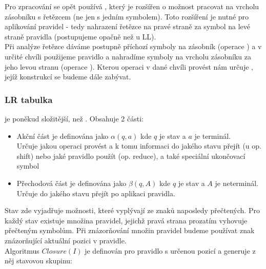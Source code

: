 Pro zpracování se opět používá , který je
rozšířen o možnost pracovat na vrcholu zásobníku s řetězcem (ne jen s jedním symbolem).
Toto rozšíření je nutné pro aplikování pravidel - tedy nahrazení řetězce na pravé straně za
symbol na levé straně pravidla (postupujeme opačně než u LL).\\

Při analýze řetězce dáváme postupně příchozí symboly na zásobník (operace )
a v určité chvíli použijeme pravidlo a nahradíme symboly na vrcholu zásobníku za
jeho levou stranu (operace ). Kterou operaci v dané chvíli provést
nám určuje , jejíž konstrukcí se budeme dále zabývat.\\

\subsubsection*{LR tabulka}

 je poněkud složitější, než . Obsahuje 2 části:

\begin{itemize}
  \item Akční část je definována jako $\alpha(q, a)$ kde $q$ je stav a $a$ je terminál.\\
  Určuje jakou operaci provést a k tomu informaci
  do jakého stavu přejít (u op. shift) nebo jaké pravidlo použít (op. reduce), a také speciální
  ukončovací symbol
  \item Přechodová část je definována jako $\beta(q, A)$ kde $q$ je stav a $A$ je neterminál.\\
  Určuje do jakého stavu přejít po aplikaci pravidla.
\end{itemize}

Stav zde vyjadřuje možnosti, které vyplývají ze znaků naposledy přečtených.
Pro každý stav existuje množina pravidel, jejichž pravá strana prozatím vyhovuje přečteným symbolům.
Při znázorňování množin pravidel budeme používat znak  znázorňující aktuální pozici v pravidle.\\

\noindent
Algoritmus $Closure(I)$ je definován pro pravidlo s určenou pozicí a generuje z něj stavovou skupinu:\\
\begin{algorithm}[H]
  \caption{$Closure(I)$}

  \BlankLine
\end{algorithm}
\vspace{0.5cm}

